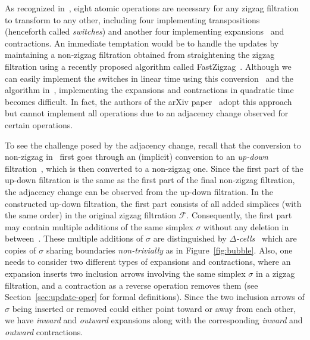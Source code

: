 \documentclass[letterpaper,11pt]{article}
\theoremstyle{mythmstyle}
\theoremstyle{mydefstyle}
\theoremstyle{plain}
\theoremstyle{definition}
\newcommand{\<}[1]{\langle #1\rangle}
\newcommand{\Fcal}{\mathcal{F}}
\newcommand{\sG}{\sigma}
\begin{document}
As recognized in~\cite{dey2021updating}, eight
atomic operations are
necessary for any zigzag filtration
to transform to any other,
including four implementing transpositions~\cite{carlsson2010zigzag,carlsson2009zigzag-realvalue,dey2023revisiting,maria2014zigzag,maria2016computing,oudot2015zigzag}
(henceforth called \emph{switches}) and 
another four implementing expansions~\cite{maria2014zigzag,maria2016computing} and contractions.
An immediate temptation would be to handle the updates
by maintaining a non-zigzag filtration 
obtained from straightening the  zigzag filtration 
using a recently proposed algorithm called {\sc FastZigzag}~\cite{dey2022fast}.
Although we can easily implement the switches
in linear time 
using this conversion~\cite{dey2022fast}
and the algorithm in~\cite{cohen2006vines}, 
implementing the expansions and contractions in quadratic time becomes difficult.
In fact, the authors of the arXiv paper~\cite{dey2021updating} adopt this approach 
but cannot  implement all operations due
to an adjacency change observed for certain operations.

To see the challenge
posed by the adjacency change,
recall that
the conversion to non-zigzag in~\cite{dey2022fast} first goes through an (implicit) conversion to 
an \emph{up-down} filtration~\cite{carlsson2009zigzag-realvalue},
which is then converted to a non-zigzag one. 
Since the first part of the up-down filtration
is the same as the first part of the final non-zigzag filtration, 
the adjacency change can be observed 
from the up-down filtration.
In the constructed up-down filtration,
the first part 
consists of all added simplices 
(with the same order) in the original zigzag filtration $\Fcal$.
Consequently, the first part may contain
multiple additions of the same simplex $\sigma$ without any deletion in between~\cite{dey2022fast}.
These multiple additions of $\sG$ are distinguished by \emph{$\Delta$-cells}~\cite{79945ceb-9a4c-3c90-a4ac-148c36996187,hatcher2002algebraic} 
which are copies of $\sG$ sharing
boundaries \emph{non-trivially} as in Figure~\ref{fig:bubble}.
Also, one needs to consider two different types of expansions and contractions,
where an expansion inserts two inclusion arrows involving the same simplex $\sG$
in a zigzag filtration, and a contraction as a reverse operation removes them
(see Section~\ref{sec:update-oper} for formal definitions).
Since the two inclusion arrows of $\sG$ being inserted or removed
could either point toward or away from each other,
we have \emph{inward} and \emph{outward} expansions
along with the corresponding \emph{inward} and \emph{outward} contractions.
\end{document}
